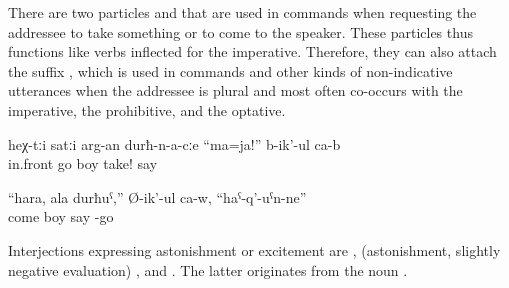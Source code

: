 There are two particles  	and   that are used in commands when requesting the addressee to take something or to come to the speaker. These particles thus functions like verbs inflected for the imperative. Therefore, they can also attach the suffix  , which is used in commands and other kinds of non-indicative utterances when the addressee is plural and most often co-occurs with the imperative, the prohibitive, and the optative.

\begin{exe}
	\ex	\label{ex:‎They say to the guys passing by, Take (a drink) minor}
	\gll	heχ-tːi		satːi	arg-an	durħ-n-a-cːe	``ma=ja!''		b-ik'-ul	ca-b\\
			in.front	go	boy	take!	say	\\
	\glt	{}

	\ex	\label{ex:‎Come, you son is arriving, he says minor}
	\gll	``hara,	ala	durħuˁ,''	Ø-ik'-ul	ca-w,	``haˁ-q'-uˁn-ne''\\
		come		boy	say		-go\\
	\glt	{}
\end{exe}	

Interjections expressing astonishment or excitement are  ,   (astonishment, slightly negative evaluation) , and   . The latter originates from the noun  .

